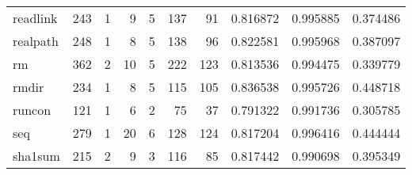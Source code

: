 \begin{tabular}{lrrrrrrrrr}
readlink  &                    243 &                                  1 &                                 9 &                                5 &                               137 &                              91 &                                0.816872 &                               0.995885 &                             0.374486 \\
realpath  &                    248 &                                  1 &                                 8 &                                5 &                               138 &                              96 &                                0.822581 &                               0.995968 &                             0.387097 \\
rm        &                    362 &                                  2 &                                10 &                                5 &                               222 &                             123 &                                0.813536 &                               0.994475 &                             0.339779 \\
rmdir     &                    234 &                                  1 &                                 8 &                                5 &                               115 &                             105 &                                0.836538 &                               0.995726 &                             0.448718 \\
runcon    &                    121 &                                  1 &                                 6 &                                2 &                                75 &                              37 &                                0.791322 &                               0.991736 &                             0.305785 \\
seq       &                    279 &                                  1 &                                20 &                                6 &                               128 &                             124 &                                0.817204 &                               0.996416 &                             0.444444 \\
sha1sum   &                    215 &                                  2 &                                 9 &                                3 &                               116 &                              85 &                                0.817442 &                               0.990698 &                             0.395349 \\

\end{tabular}
